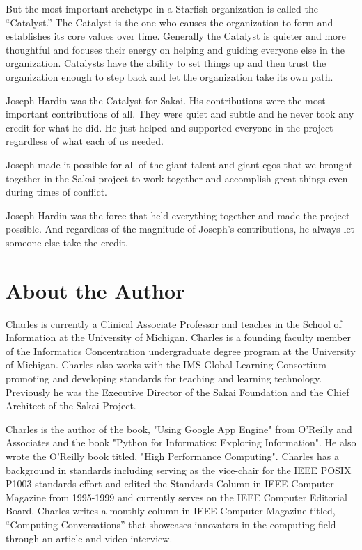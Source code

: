 \documentclass[12pt]{book}
\begin{document}
But the most important archetype in a Starfish organization
is called the ``Catalyst.''  The Catalyst is the one who causes
the organization to form and establishes its core values
over time.  Generally
the Catalyst is quieter and more thoughtful and focuses their
energy on helping and guiding everyone else in the organization.
Catalysts have the ability to set things up and then trust the
organization enough to step back and let the organization take its
own path.

Joseph Hardin was the Catalyst for Sakai.  His contributions were
the most important contributions of all.  They were quiet and subtle
and he never took any credit for what he did.  He just helped and
supported everyone in the project regardless of what each of us
needed.

Joseph made it possible for all of the giant talent and giant egos
that we brought together in the Sakai project to work together and accomplish
great things even during times of conflict.

Joseph Hardin was the force that held everything together and made
the project possible.  And regardless of the magnitude of Joseph's
contributions, he always let someone else take the credit.

% 

\newpage

\section*{About the Author}

Charles is currently a Clinical Associate Professor and teaches in the School of Information at the University of Michigan. Charles is a founding faculty member of the Informatics Concentration undergraduate degree program at the University of Michigan. Charles also works with the IMS Global Learning Consortium promoting and developing standards for teaching and learning technology. Previously he was the Executive Director of the Sakai Foundation and the Chief Architect of the Sakai Project.

Charles is the author of the book, "Using Google App Engine" from O'Reilly and Associates and the book "Python for Informatics: Exploring Information". He also wrote the O'Reilly book titled, "High Performance Computing". Charles has a background in standards including serving as the vice-chair for the IEEE POSIX P1003 standards effort and edited the Standards Column in IEEE Computer Magazine from 1995-1999 and currently serves on the IEEE Computer Editorial Board.  Charles
writes a monthly column in IEEE Computer Magazine titled, ``Computing Conversations''
that showcases innovators in the computing field through an article and video interview.
\end{document}

